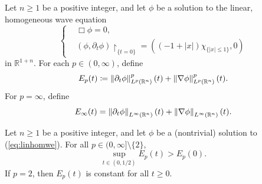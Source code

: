 \documentclass{article}
\begin{document}
\begin{definition}[Energy]
	Let $n \geq 1$ be a positive integer, and let $\phi$ be a solution to the linear, homogeneous wave equation 
	\begin{equation}
		\left\{
		\begin{alignedat}{1}
			&\Box\phi = 0, \\
			&(\phi, \partial_{t}\phi)\upharpoonright_{\{t = 0\}} = ((-1 + |x|)\chi_{\{|x| \leq 1\}}, 0)
		\end{alignedat}
		\right. 
		\label{eq:linhomwe}
	\end{equation}
	in $\mathbb{R}^{1 + n}$. For each $p \in (0,\infty)$, define 
	\begin{equation*}
		E_{p}(t) \coloneqq \left\Vert \partial_{t}\phi \right\Vert_{L^{p}(\mathbb{R}^{n})}^{p}(t) + \left\Vert \nabla \phi \right\Vert_{L^{p}(\mathbb{R}^{n})}^{p}(t). 
	\end{equation*}
	For $p = \infty$, define 
	\begin{equation*}
		E_{\infty}(t) = \left\Vert \partial_{t}\phi \right\Vert_{L^{\infty}(\mathbb{R}^{n})}(t) + \left\Vert \nabla \phi \right\Vert_{L^{\infty}(\mathbb{R}^{n})}(t). 
	\end{equation*}
\end{definition}
\begin{conj*}
	Let $n \geq 1$ be a positive integer, and let $\phi$ be a (nontrivial) solution to (\ref{eq:linhomwe}). For all $p \in (0, \infty]\setminus\{2\}$, 
	\begin{equation*}
		\sup_{t \in (0,1/2)}E_{p}(t) > E_{p}(0). 
	\end{equation*}
	If $p = 2$, then $E_{p}(t)$ is constant for all $t \geq 0$. 
\end{conj*}

\newpage 
\end{document}
